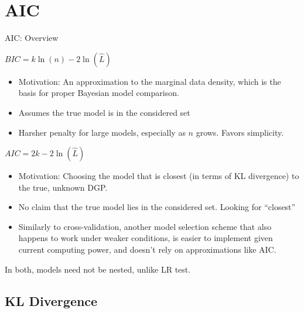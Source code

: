 \documentclass[aspectratio=169, handout]{beamer}
\begin{document}
\section{AIC}

{\footnotesize
\begin{frame}{AIC: Overview}

$BIC = k\ln(n) - 2\ln(\hat{L})$
\begin{itemize}
  \item \alert{Motivation}: An approximation to the
    \alert{marginal data density}, which is the basis for proper
    Bayesian model comparison.
  \item \alert{Assumes} the \alert{true} model is in the considered set
  \item Harsher penalty for large models, especially as $n$
    grows. Favors simplicity.
\end{itemize}
$AIC = 2k - 2\ln (\hat{L})$
\begin{itemize}
  \item \alert{Motivation}: Choosing the model that is \alert{closest}
    (in terms of KL divergence) to the \alert{true, unknown DGP}.
  \item \alert{No claim} that the \alert{true} model lies in the
    considered set. Looking for ``closest''
  \item Similarly to \alert{cross-validation}, another model selection
    scheme that also happens to work under weaker conditions, is
    easier to implement given current computing power, and doesn't rely
    on approximations like AIC.
\end{itemize}
In both, models \alert{need not} be nested, unlike LR test.
\end{frame}
}



\subsection{KL Divergence}
\end{document}
